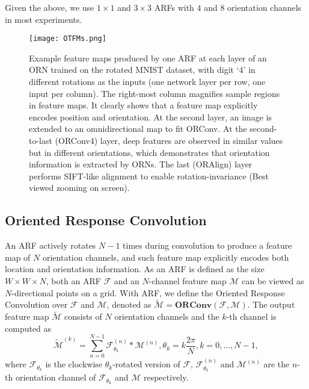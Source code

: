 \documentclass[10pt,twocolumn,letterpaper]{article}
\begin{document}
        Given the above, we use $1\times1$ and $3\times3$ ARFs with $4$ and $8$ orientation channels in most experiments.

        \begin{figure}[t]
            \begin{center}
                \texttt{[image: OTFMs.png]}
            \end{center}
            \caption{
                Example feature maps produced by one ARF at each layer of an ORN trained on the rotated MNIST dataset, with digit `4' in different rotations as the inputs (one network layer per row, one input per column).
                The right-most column magnifies sample regions in feature maps.
                It clearly shows that a feature map explicitly encodes position and orientation.
                At the second layer, an image is extended to an omnidirectional map to fit ORConv.
                At the second-to-last (ORConv4) layer, deep features are observed in similar values but in different orientations, which demonstrates that orientation information is extracted by ORNs.
                The last (ORAlign) layer performs SIFT-like alignment to enable rotation-invariance
                (Best viewed zooming on screen).
            }
        \label{fig:OFTM}
        \end{figure}


\subsection{Oriented Response Convolution}
    An ARF actively rotates $N-1$ times during convolution to produce a feature map of $N$ orientation channels, and such feature map explicitly encodes both location and orientation information.
    As an ARF is defined as the size $W \times W \times N$, both an ARF $\mathcal{F}$ and an $N$-channel feature map $\mathcal{M}$ can be viewed as $N$-directional points on a grid.
    With ARF, we define the Oriented Response Convolution over $\mathcal{F}$ and $\mathcal{M}$, denoted as $\tilde{\mathcal{M}} = \mathbf{ORConv}(\mathcal{F},\mathcal{M})$.
    The output feature map $\tilde{\mathcal{M}}$ consists of $N$ orientation channels and the $k$-th channel is computed as
    \begin{equation}
       \tilde{\mathcal{M}}^{(k)}  = \sum_{n=0}^{N-1}\mathcal{F}_{\theta_k}^{(n)} \ast \mathcal{M}^{(n)},
       \theta_k = k\frac{2\pi}{N}, {\scriptstyle k=0,...,N-1},
    \label{eq:ORConv}
    \end{equation}
    where $\mathcal{F}_{\theta_k}$ is the clockwise $\theta_k$-rotated version of $\mathcal{F}$, $\mathcal{F}_{\theta_k}^{(n)}$ and $\mathcal{M}^{(n)}$ are the $n$-th orientation channel of $\mathcal{F}_{\theta_k}$ and $\mathcal{M}$ respectively.
\end{document}
